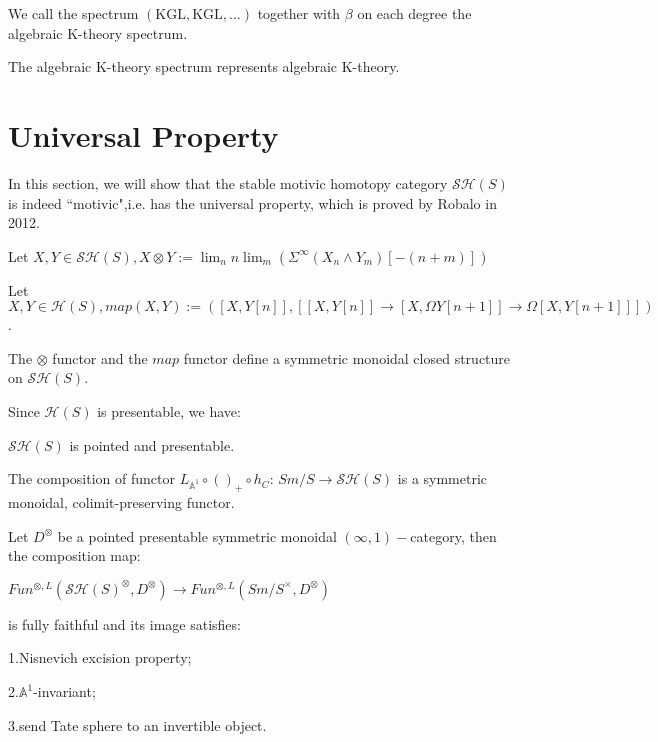 \begin{definition}
    We call the spectrum $(\text{KGL},\text{KGL},...)$ together with $\beta$ on each degree the algebraic K-theory spectrum.
\end{definition}

\begin{proposition}
    The algebraic K-theory spectrum represents algebraic K-theory.
\end{proposition}

\section{Universal Property}

In this section, we will show that the stable motivic homotopy category $\mathcal{SH}(S)$ is indeed ``motivic",i.e. has the universal property, which is proved by Robalo in 2012\cite{Robalo2012arxiv}.

\begin{definition}
    Let $X,Y \in \mathcal{SH}(S),X \otimes Y:=\lim _n n \lim _m\left(\Sigma^{\infty}\left(X_n \wedge Y_m\right)[-(n+m)]\right)$
\end{definition}

\begin{definition}
    Let $X,Y \in \mathcal{H}(S), map(X,Y):=([X,Y[n]],[[X,Y[n]]\to [X,\Omega Y[n+1]]\to \Omega[X,Y[n+1]]])$.
\end{definition}

\begin{proposition}
    The $\otimes$ functor and the $map$ functor define a symmetric monoidal closed structure on $\mathcal{SH}(S)$.
\end{proposition}

Since $\mathcal{H}(S)$ is presentable, we have:

\begin{proposition}
    $\mathcal{SH}(S)$ is pointed and presentable.
\end{proposition}

\begin{proposition}
    The composition of functor $L_{\mathbb{A}^1}\circ()_+\circ h_C$: $Sm/S \to \mathcal{SH}(S)$ is a symmetric monoidal, colimit-preserving functor.
\end{proposition}

\begin{theorem}\cite{Robalo2012arxiv}
    Let $D^{\otimes}$ be a pointed presentable symmetric monoidal $(\infty,1)-$category, then the composition map:

    $Fun^{\otimes,L}(\mathcal{SH}(S)^\otimes,D^\otimes)\to Fun^{\otimes,L}(Sm/S^\times,D^\otimes)$ 

    is fully faithful and its image satisfies:

    1.Nisnevich excision property;

    2.$\mathbb{A}^1$-invariant; 

    3.send Tate sphere to an invertible object.

    
\end{theorem}

